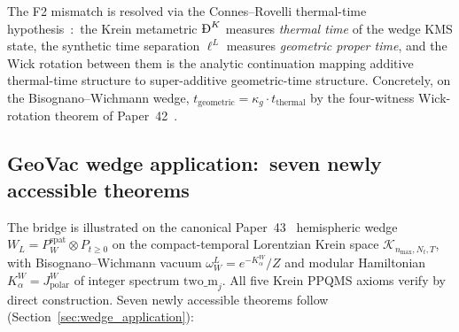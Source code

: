 \documentclass[11pt,a4paper]{article}
\theoremstyle{plain}
\theoremstyle{definition}
\newcommand{\nmax}{n_{\max}}
\newcommand{\Nt}{N_{t}}
\newcommand{\Krein}{\mathcal{K}}
\newcommand{\spat}{\mathrm{spat}}
\newcommand{\BigDeth}{\text{\DJ}^{K}}
\newcommand{\BWvac}{\omega_{W}^{L}}
\newcommand{\Kalpha}{K_{\alpha}^{W}}
\newcommand{\kappag}{\kappa_{g}}
\begin{document}
The F2 mismatch is resolved via the Connes--Rovelli thermal-time
hypothesis~\cite{connes_rovelli1994}:\ the Krein metametric
$\BigDeth$ measures \emph{thermal time} of the wedge KMS state, the
synthetic time separation $\ell^{L}$ measures \emph{geometric proper
time}, and the Wick rotation between them is the analytic continuation
mapping additive thermal-time structure to super-additive
geometric-time structure. Concretely, on the
Bisognano--Wichmann wedge,
$t_{\mathrm{geometric}} = \kappag \cdot t_{\mathrm{thermal}}$
by the four-witness Wick-rotation theorem of Paper~42~\cite{paper42}.

\subsection{GeoVac wedge application:\ seven newly accessible theorems}
\label{sec:wedge_headline}

The bridge is illustrated on the canonical Paper~43~\cite{paper43}
hemispheric wedge $W_{L} = P_{W}^{\spat} \otimes P_{t \ge 0}$ on the
compact-temporal Lorentzian Krein space $\Krein_{\nmax, \Nt, T}$, with
Bisognano--Wichmann vacuum $\BWvac = e^{-\Kalpha}/Z$ and modular
Hamiltonian $\Kalpha = J_{\mathrm{polar}}^{W}$ of integer spectrum
$\mathrm{two\_m}_{j}$. All five Krein PPQMS axioms verify by direct
construction. Seven newly accessible theorems follow
(Section~\ref{sec:wedge_application}):
\end{document}
